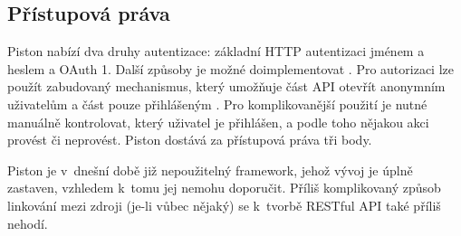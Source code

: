 \subsection{Přístupová práva}\label{pux159uxedstupovuxe1-pruxe1va}

Piston nabízí dva druhy autentizace: základní HTTP autentizaci jménem a heslem a OAuth 1. Další způsoby je možné doimplementovat \autocite{pistonauth}. Pro autorizaci lze použít zabudovaný mechanismus, který umožňuje část API otevřít anonymním uživatelům a část pouze přihlášeným \autocite{pistonanon}. Pro komplikovanější použití je nutné manuálně kontrolovat, který uživatel je přihlášen, a podle toho nějakou akci provést či neprovést. Piston dostává za přístupová práva tři body.

Piston je v~dnešní době již nepoužitelný framework, jehož vývoj je úplně zastaven, vzhledem k~tomu jej nemohu doporučit. Příliš komplikovaný způsob linkování mezi zdroji (je-li vůbec nějaký) se k~tvorbě RESTful API také příliš nehodí.
